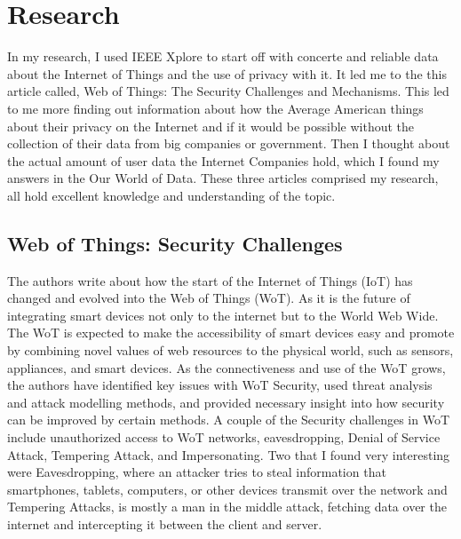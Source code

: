 \documentclass[10.5pt, twoside,twocolumn]{article}
\begin{document}

\section{Research}
In my research, I used IEEE Xplore to start off with concerte and reliable data about the Internet of Things and the use of privacy with it. It led me to the this article called, Web of Things: The Security Challenges and Mechanisms\cite{9349366}. This led to me more finding out information about how the Average American things about their privacy on the Internet and if it would be possible without the collection of their data from big companies or government\cite{auxier_rainie_anderson_perrin_kumar_turner_2020}. Then I thought about the actual amount of user data the Internet Companies hold, which I found my answers in the Our World of Data\cite{owidinternet}. These three articles comprised my research, all hold excellent knowledge and understanding of the topic.

\subsection{Web of Things: Security Challenges}
The authors write about how the start of the Internet of Things (IoT) has changed and evolved into the Web of Things (WoT). As it is the future of integrating smart devices not only to the internet but to the World Web Wide. The WoT is expected to make the accessibility of smart devices easy and promote by combining novel values of web resources to the physical world, such as sensors, appliances, and smart devices. As the connectiveness and use of the WoT grows, the authors have identified key issues with WoT Security, used threat analysis and attack modelling methods, and provided necessary insight into how security can be improved by certain methods. A couple of the Security challenges in WoT include unauthorized access to WoT networks, eavesdropping, Denial of Service Attack, Tempering Attack, and Impersonating. Two that I found very interesting were Eavesdropping, where an attacker tries to steal information that smartphones, tablets, computers, or other devices transmit over the network and Tempering Attacks, is mostly a man in the middle attack, fetching data over the internet and intercepting it between the client and server.


\end{document}
